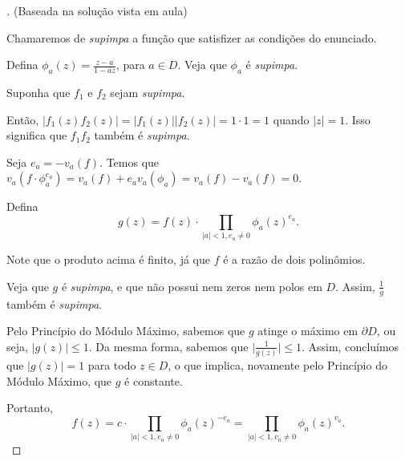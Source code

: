 \begin{proof}[] (Baseada na solução vista em aula)

Chamaremos de \textit{supimpa} a função que satisfizer as condições do enunciado.

Defina $\phi_a(z)=\frac{z-a}{1-\overline{a}z}$, para $a \in D$. Veja que $\phi_a$ é \textit{supimpa}.

Suponha que $f_1$ e $f_2$ sejam \textit{supimpa}.

Então, $\lvert f_1(z)f_2(z)\rvert=\lvert f_1(z)\rvert\lvert f_2(z)\rvert=1\cdot 1=1$ quando $\lvert z\rvert =1$. Isso significa que $f_1f_2$ também é \textit{supimpa}.

Seja $e_a=-v_a(f)$. Temos que $v_a(f\cdot \phi_a^{e_a})=v_a(f)+e_av_a(\phi_a)=v_a(f)-v_a(f)=0$.

Defina $$g(z)=f(z)\cdot \prod_{\lvert a \rvert < 1, e_a\neq 0}\phi_a(z)^{e_a}.$$

Note que o produto acima é finito, já que $f$ é a razão de dois polinômios.

Veja que $g$ é \textit{supimpa}, e que não possui nem zeros nem polos em $D$. Assim, $\frac{1}{g}$ também é \textit{supimpa}.

Pelo Princípio do Módulo Máximo, sabemos que $g$ atinge o máximo em $\partial D$, ou seja, $\lvert g(z) \rvert\leq 1$. Da mesma forma, sabemos que $\lvert \frac{1}{g(z)} \rvert \leq 1$. Assim, concluímos que $\lvert g(z) \rvert = 1$ para todo $z\in D$, o que implica, novamente pelo Princípio do Módulo Máximo, que $g$ é constante.

Portanto, $$f(z)= c\cdot \prod_{\lvert a \rvert < 1, e_a\neq 0}\phi_a(z)^{-e_a}=\prod_{\lvert a \rvert < 1, v_a\neq 0}\phi_a(z)^{v_a}.$$
\end{proof}
